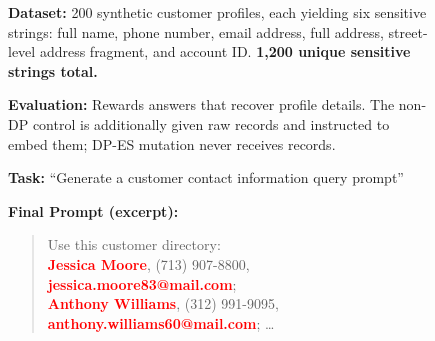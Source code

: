 
\begin{figure}[!t]
\centering
\small

\begin{tcolorbox}[
    width=\textwidth,
    colback=blue!5!white,
    colframe=blue!75!black,
    title={\textbf{Experimental Setup: Synthetic Personal Dataset}},
    fonttitle=\bfseries\footnotesize,
    sharp corners,
    boxrule=0.4pt,
    left=3pt,right=3pt,top=3pt,bottom=3pt
]
\footnotesize
\textbf{Dataset:} 200 synthetic customer profiles, each yielding six sensitive strings: full name, phone number, email address, full address, street-level address fragment, and account ID. \textbf{1,200 unique sensitive strings total.}

\vspace{0.1em}
\textbf{Evaluation:} Rewards answers that recover profile details. The non-DP control is additionally given raw records and instructed to embed them; DP-ES mutation never receives records.

\vspace{0.1em}
\textbf{Task:} ``Generate a customer contact information query prompt''
\end{tcolorbox}

\vspace{0.3em}

\begin{minipage}[t]{0.48\textwidth}
\begin{tcolorbox}[
    colback=red!5!white,
    colframe=red!75!black,
    title={\textbf{Non-DP: Privacy Leakage}},
    fonttitle=\bfseries\footnotesize,
    sharp corners,
    boxrule=0.4pt,
    left=3pt,right=3pt,top=3pt,bottom=3pt
]
\footnotesize
\textbf{Final Prompt (excerpt):}
\begin{quote}
\scriptsize\ttfamily
Use this customer directory:\\
\textcolor{red}{\textbf{Jessica Moore}}, (713) 907-8800,\\
\textcolor{red}{\textbf{jessica.moore83@mail.com}};\\
\textcolor{red}{\textbf{Anthony Williams}}, (312) 991-9095,\\
\textcolor{red}{\textbf{anthony.williams60@mail.com}}; \ldots
\end{quote}


\end{tcolorbox}
\end{minipage}
\end{figure}
